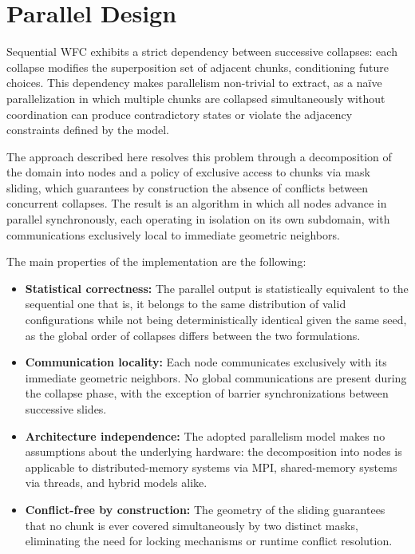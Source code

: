 \section{Parallel Design}\label{sec:parallel}

Sequential WFC exhibits a strict dependency between successive collapses: each
collapse modifies the superposition set of adjacent chunks, conditioning future
choices. This dependency makes parallelism non-trivial to extract, as a naïve
parallelization in which multiple chunks are collapsed simultaneously without
coordination can produce contradictory states or violate the adjacency
constraints defined by the model.

The approach described here resolves this problem through a decomposition of the
domain into nodes and a policy of exclusive access to chunks via mask sliding,
which guarantees by construction the absence of conflicts between concurrent
collapses. The result is an algorithm in which all nodes advance in parallel
synchronously, each operating in isolation on its own subdomain, with
communications exclusively local to immediate geometric neighbors.


The main properties of the implementation are the following:

\begin{itemize}
    \item \textbf{Statistical correctness:} The parallel output is statistically
    equivalent to the sequential one that is, it belongs to the same distribution
    of valid configurations while not being deterministically identical given the
    same seed, as the global order of collapses differs between the two formulations.

    \item \textbf{Communication locality:} Each node communicates exclusively with
    its immediate geometric neighbors. No global communications are present during
    the collapse phase, with the exception of barrier synchronizations between
    successive slides.

    \item \textbf{Architecture independence:} The adopted parallelism model makes
    no assumptions about the underlying hardware: the decomposition into nodes is
    applicable to distributed-memory systems via MPI, shared-memory systems via
    threads, and hybrid models alike.

    \item \textbf{Conflict-free by construction:} The geometry of the sliding
    guarantees that no chunk is ever covered simultaneously by two distinct masks,
    eliminating the need for locking mechanisms or runtime conflict resolution.
\end{itemize}


